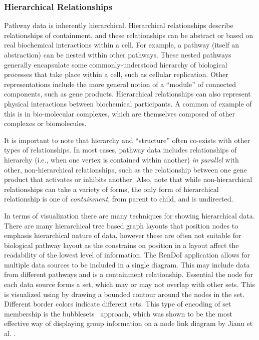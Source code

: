 \documentclass[journal]{vgtc}                %
\begin{document}
\subsubsection{Hierarchical Relationships}

Pathway data is inherently hierarchical.
Hierarchical relationships describe relationships of containment, and these relationships can be abstract or based on real biochemical interactions within a cell.
For example, a pathway (itself an abstraction) can be nested within other pathways.
These nested pathways generally encapsulate some commonly-understood hierarchy of biological processes that take place within a cell, such as cellular replication.
Other representations include the more general notion of a ``module'' of connected components, such as gene products.
Hierarchical relationships can also represent physical interactions between biochemical participants.
A common of example of this is in bio-molecular complexes, which are themselves composed of other complexes or biomolecules.

It is important to note that hierarchy and ``structure'' often co-exists with other types of relationships. In most cases, pathway data includes relationships of hierarchy (i.e., when one vertex is contained within another) \textit{in parallel} with other, non-hierarchical relationships, such as the relationship between one gene product that activates or inhibits another. Also, note that while non-hierarchical relationships can take a variety of forms, the only form of hierarchical relationship is one of \textit{containment}, from parent to child, and is undirected.

In terms of visualization there are many techniques for showing hierarchical data.
There are many hierarchical tree based graph layouts that position nodes to emphasis hierarchical nature of data, however these are often not suitable for biological pathway layout as the constrains on position in a layout affect the readability of the lowest level of information.
The RenDoI application allows for multiple data sources to be included in a single diagram. 
This may include data from different pathways and is a containment relationship. Essential the node for each data source forms a set, which may or may not overlap with other sets.  
This is visualized using by drawing a bounded contour around the nodes in the set. Different border colors indicate different sets.
This type of encoding of  set membership is the bubblesets~\cite{Collins2009} approach, which was shown to be the most effective way of displaying group information on a node link diagram by Jianu et al. \cite{Jianu2014}.
\end{document}
